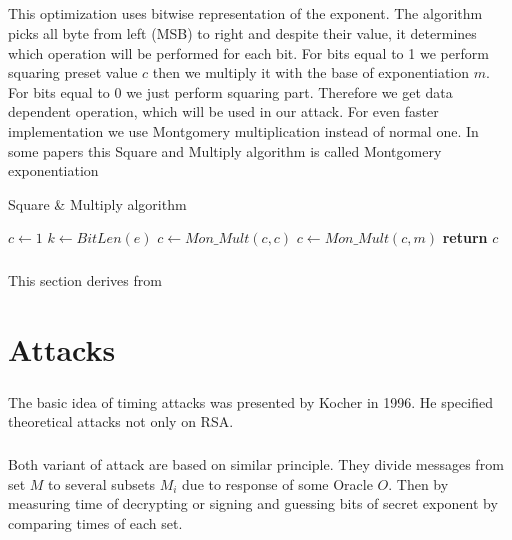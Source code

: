 \documentclass[thesis=B,english]{FITthesis}[2012/10/20]
\begin{document}
{{\paragraph*{}
{This optimization uses bitwise representation of the exponent. The algorithm picks all byte from left (MSB) to right and despite their value, 
it determines which operation will be performed for each bit. For bits equal to 1 we perform squaring preset value \(c\) then we multiply it with the base of exponentiation \(m\). 
For bits equal to 0 we just perform squaring part. Therefore we get data dependent operation, which will be used in our attack. For even faster implementation we use Montgomery
multiplication instead of normal one. In some papers this Square and Multiply algorithm is called Montgomery exponentiation}



\begin{algorithm}[H]
\caption{Square \& Multiply algorithm}
\begin{algorithmic}[1]
 \State $c\gets 1$
 \State $k\gets BitLen(e)$
  \State $c \gets Mon\_Mult(c,c)$
   \State $c \gets Mon\_Mult(c,m)$
  \EndIf
 \EndFor
\State \textbf{return} $c$
\EndFunction
 
\end{algorithmic}
\end{algorithm}

\paragraph*{}{This section derives from \cite{koc2}}



\chapter{Attacks}
\paragraph*{}{
The basic idea of timing attacks was presented by Kocher in 1996. He specified theoretical attacks not only on RSA.
}\cite{Kocher1996}

\paragraph*{}{
Both variant of attack are based on similar principle. They divide messages from set \(M\) to several subsets \(M_i\) due to response of some Oracle \(O\). Then by measuring time of decrypting or signing and 
guessing bits of secret exponent by comparing times of each set.\cite{Kocher1996}\cite{mi-kry}
}

}}
\end{document}
